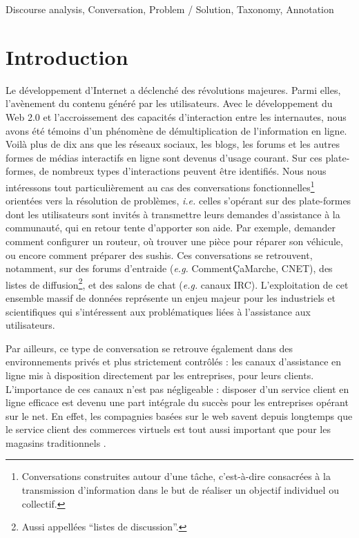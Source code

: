 \documentclass[10pt,a4paper,twoside]{article}
\newcommand{\quotes}[1]{``#1''}
\begin{document}
{Discourse analysis, Conversation, Problem / Solution, Taxonomy, Annotation}


\section{Introduction}
\label{sec:introduction}

Le développement d'Internet a déclenché des révolutions majeures. Parmi elles, l'avènement du contenu généré par les utilisateurs. Avec le développement du Web 2.0 et l'accroissement des capacités d'interaction entre les internautes, nous avons été témoins d'un phénomène de démultiplication de l'information en ligne. Voilà plus de dix ans que les réseaux sociaux, les blogs, les forums et les autres formes de médias interactifs en ligne sont devenus d'usage courant. Sur ces plate-formes, de nombreux types d'interactions peuvent être identifiés. Nous nous intéressons tout particulièrement au cas des conversations fonctionnelles\footnote{Conversations construites autour d'une tâche, c'est-à-dire consacrées à la transmission d'information dans le but de réaliser un objectif individuel ou collectif.} orientées vers la résolution de problèmes, \textit{i.e.} celles s'opérant sur des plate-formes dont les utilisateurs sont invités à transmettre leurs demandes d'assistance à la communauté, qui en retour tente d'apporter son aide. Par exemple, demander comment configurer un routeur, où trouver une pièce pour réparer son véhicule, ou encore comment préparer des sushis. Ces conversations se retrouvent, notamment, sur des forums d'entraide (\textit{e.g.} CommentÇaMarche, CNET), des listes de diffusion\footnote{Aussi appellées \quotes{listes de discussion}.}, et des salons de chat (\textit{e.g.} canaux IRC). L'exploitation de cet ensemble massif de données représente un enjeu majeur pour les industriels et scientifiques qui s'intéressent aux problématiques liées à l'assistance aux utilisateurs.

Par ailleurs, ce type de conversation se retrouve également dans des environnements privés et plus strictement contrôlés : les canaux d'assistance en ligne mis à disposition directement par les entreprises, pour leurs clients. L'importance de ces canaux n'est pas négligeable : disposer d'un service client en ligne efficace est devenu une part intégrale du succès pour les entreprises opérant sur le net. En effet, les compagnies basées sur le web savent depuis longtemps que le service client des commerces virtuels est tout aussi important que pour les magasins traditionnels \cite{bernett2000e}.
\end{document}
